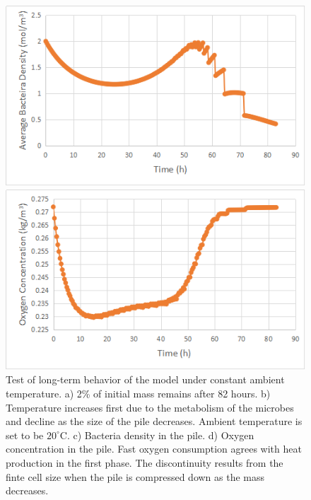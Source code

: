 \documentclass[12pt, letterpaper, titlepage]{article}
\begin{document}
\begin{figure}
\begin{minipage}[b]{0.5\linewidth}
  \end{minipage} 
  \begin{minipage}[b]{0.5\linewidth}\centering
    \includegraphics[width=1\linewidth]{long-o} 
  \end{minipage}
  \hfill
  \begin{minipage}[b]{0.5\linewidth}\centering
    \includegraphics[width=1\linewidth]{long-x} 
  \end{minipage} 
  \caption{ Test of long-term behavior of the model under constant ambient temperature. a) 2\% of initial mass remains after 82 hours. b) Temperature increases first due to the metabolism of the microbes and decline as the size of the pile decreases. Ambient temperature is set to be $20^{\circ}$C. c) Bacteria density in the pile. d) Oxygen concentration in the pile. Fast oxygen consumption agrees with heat production in the first phase. The discontinuity results from the finte cell size when the pile is compressed down as the mass decreases.} 
\end{figure}
\end{document}
